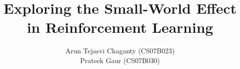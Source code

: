 \documentclass[a4paper,twocolumn]{article}
\title{Exploring the Small-World Effect in Reinforcement Learning}
\author{Arun Tejasvi Chaganty (CS07B023) \\ Prateek Gaur (CS07B030)}
\begin{document}
\maketitle



{}



%
\end{document}
